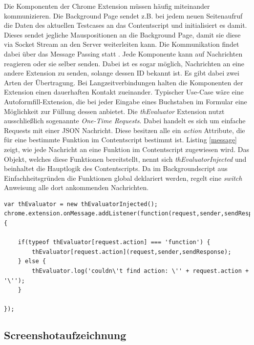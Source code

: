 Die Komponenten der Chrome Extension müssen häufig miteinander kommunizieren. Die Background Page sendet z.B. bei jedem neuen Seitenaufruf die Daten des aktuellen Testcases an das Contentscript und initialisiert es damit. Dieses sendet jegliche Mauspositionen an die Background Page, damit sie diese via Socket Stream an den Server weiterleiten kann. Die Kommunikation findet dabei über das Message Passing statt \cite{messagePassing}. Jede Komponente kann auf Nachrichten reagieren oder sie selber senden. Dabei ist es sogar möglich, Nachrichten an eine andere Extension zu senden, solange dessen ID bekannt ist. Es gibt dabei zwei Arten der Übertragung. Bei Langzeitverbindungen halten die Komponenten der Extension einen dauerhaften Kontakt zueinander. Typischer Use-Case wäre eine Autoformfill-Extension, die bei jeder Eingabe eines Buchstaben im Formular eine Möglichkeit zur Füllung dessen anbietet. Die \textit{thEvaluator} Extension nutzt ausschließlich sogenannte \textit{One-Time Requests}. Dabei handelt es sich um einfache Requests mit einer JSON Nachricht. Diese besitzen alle ein \textit{action} Attribute, die für eine bestimmte Funktion im Contentscript bestimmt ist. Listing \ref{message} zeigt, wie jede Nachricht an eine Funktion im Contentscript zugewiesen wird. Das Objekt, welches diese Funktionen bereitstellt, nennt sich \textit{thEvaluatorInjected} und beinhaltet die Hauptlogik des Contentscripts. Da im Backgroundscript aus Einfachheitsgründen die Funktionen global deklariert werden, regelt eine \textit{switch} Anweisung alle dort ankommenden Nachrichten.
\\
\begin{lstlisting}[caption=Message Handeling im Contentscript,label=message]
var thEvaluator = new thEvaluatorInjected();
chrome.extension.onMessage.addListener(function(request,sender,sendResponse){

    if(typeof thEvaluator[request.action] === 'function') {
        thEvaluator[request.action](request,sender,sendResponse);
    } else {
        thEvaluator.log('couldn\'t find action: \'' + request.action + '\'');
    }

});
\end{lstlisting}

\subsection{Screenshotaufzeichnung}
\label{screenshot}

